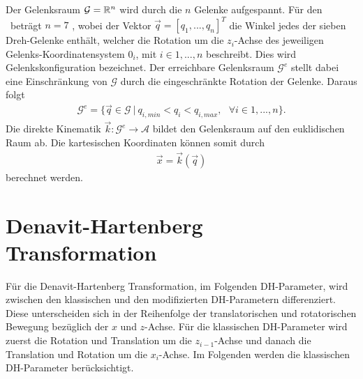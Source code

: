 Der Gelenksraum $\mathcal{G} = \mathbb{R}^n$ wird durch die $n$ Gelenke aufgespannt. Für den \kuka \ beträgt $n = 7$ , wobei der Vektor $\vec{q} = [q_1,...,q_n]^T$ die Winkel jedes der sieben Dreh-Gelenke enthält, welcher die Rotation um die $z_i$-Achse  des jeweiligen Gelenks-Koordinatensystem $0_i$, mit $i \in {1,...,n}$ beschreibt. Dies wird Gelenkskonfiguration bezeichnet. Der erreichbare Gelenksraum $\mathcal{G}^e$ stellt dabei eine Einschränkung von $\mathcal{G}$ durch die eingeschränkte Rotation der Gelenke. Daraus folgt 
\begin{align}
\mathcal{G}^e = \{ \vec{q} \in \mathcal{G} \ | \ q_{i,min} < q_i < q_{i,max}, \ \ \ \forall i \in 1,...,n \}.
\end{align}
Die direkte Kinematik $ \vec{k} : \mathcal{G}^e \rightarrow \mathcal{A}$ bildet den Gelenksraum auf den euklidischen Raum ab. Die kartesischen Koordinaten können somit durch 
\begin{align}
\vec{x} = \vec{k}(\vec{q})
\end{align}
berechnet werden. 


\section{Denavit-Hartenberg Transformation}
Für die Denavit-Hartenberg Transformation, im Folgenden DH-Parameter,  wird zwischen den klassischen und den modifizierten DH-Parametern differenziert. Diese unterscheiden sich in der Reihenfolge der translatorischen und rotatorischen Bewegung bezüglich der $x$ und $z$-Achse. Für die klassischen DH-Parameter wird zuerst die Rotation und Translation um die $z_{i-1}$-Achse und danach die Translation und Rotation um die $x_i$-Achse. Im Folgenden werden die klassischen DH-Parameter berücksichtigt. \\


